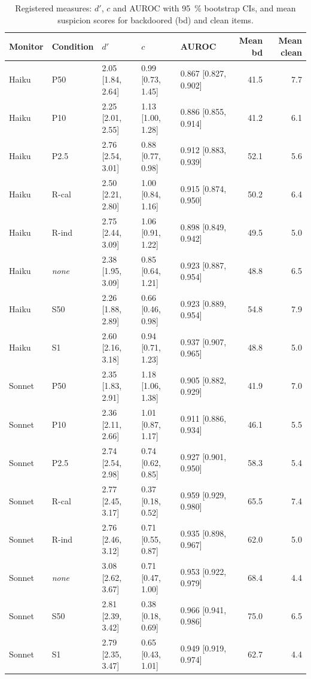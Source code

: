 \documentclass[manuscript, screen, review]{jair}
\begin{document}
\begin{table}[h]
\centering
\small
\setlength{\tabcolsep}{4pt}
\caption{Registered measures: $d'$, $c$ and AUROC with \SI{95}{\percent} bootstrap CIs, and mean suspicion scores for backdoored (bd) and clean items.}\label{tab:sdt}
\begin{tabular}{@{}l l l l l r r@{}}
\toprule
Monitor & Condition & $d'$ & $c$ & AUROC & Mean bd & Mean clean \\
\midrule
Haiku & P50 & 2.05 [1.84, 2.64] & 0.99 [0.73, 1.45] & 0.867 [0.827, 0.902] & 41.5 & 7.7 \\
Haiku & P10 & 2.25 [2.01, 2.55] & 1.13 [1.00, 1.28] & 0.886 [0.855, 0.914] & 41.2 & 6.1 \\
Haiku & P2.5 & 2.76 [2.54, 3.01] & 0.88 [0.77, 0.98] & 0.912 [0.883, 0.939] & 52.1 & 5.6 \\
Haiku & R-cal & 2.50 [2.21, 2.80] & 1.00 [0.84, 1.16] & 0.915 [0.874, 0.950] & 50.2 & 6.4 \\
Haiku & R-ind & 2.75 [2.44, 3.09] & 1.06 [0.91, 1.22] & 0.898 [0.849, 0.942] & 49.5 & 5.0 \\
Haiku & \emph{none} & 2.38 [1.95, 3.09] & 0.85 [0.64, 1.21] & 0.923 [0.887, 0.954] & 48.8 & 6.5 \\
Haiku & S50 & 2.26 [1.88, 2.89] & 0.66 [0.46, 0.98] & 0.923 [0.889, 0.954] & 54.8 & 7.9 \\
Haiku & S1 & 2.60 [2.16, 3.18] & 0.94 [0.71, 1.23] & 0.937 [0.907, 0.965] & 48.8 & 5.0 \\
\midrule
Sonnet & P50 & 2.35 [1.83, 2.91] & 1.18 [1.06, 1.38] & 0.905 [0.882, 0.929] & 41.9 & 7.0 \\
Sonnet & P10 & 2.36 [2.11, 2.66] & 1.01 [0.87, 1.17] & 0.911 [0.886, 0.934] & 46.1 & 5.5 \\
Sonnet & P2.5 & 2.74 [2.54, 2.98] & 0.74 [0.62, 0.85] & 0.927 [0.901, 0.950] & 58.3 & 5.4 \\
Sonnet & R-cal & 2.77 [2.45, 3.17] & 0.37 [0.18, 0.52] & 0.959 [0.929, 0.980] & 65.5 & 7.4 \\
Sonnet & R-ind & 2.76 [2.46, 3.12] & 0.71 [0.55, 0.87] & 0.935 [0.898, 0.967] & 62.0 & 5.0 \\
Sonnet & \emph{none} & 3.08 [2.62, 3.67] & 0.71 [0.47, 1.00] & 0.953 [0.922, 0.979] & 68.4 & 4.4 \\
Sonnet & S50 & 2.81 [2.39, 3.42] & 0.38 [0.18, 0.69] & 0.966 [0.941, 0.986] & 75.0 & 6.5 \\
Sonnet & S1 & 2.79 [2.35, 3.47] & 0.65 [0.43, 1.01] & 0.949 [0.919, 0.974] & 62.7 & 4.4 \\
\bottomrule
\end{tabular}
\end{table}
\end{document}
